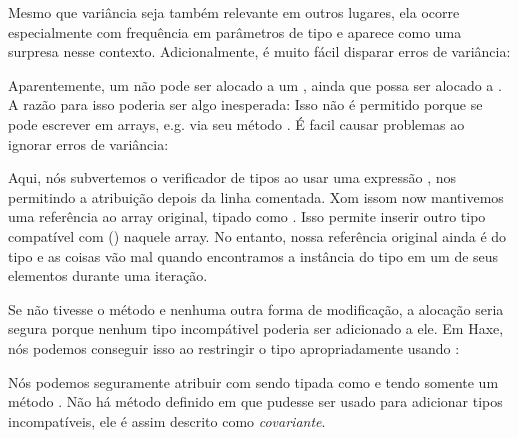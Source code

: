 Mesmo que variância seja também relevante em outros lugares, ela ocorre especialmente com frequência em parâmetros de tipo e aparece como uma surpresa nesse contexto. Adicionalmente, é muito fácil disparar erros de variância:


Aparentemente, um  não pode ser alocado a um , ainda que  possa ser alocado a . A razão para isso poderia ser algo inesperada: Isso não é permitido porque se pode escrever em arrays, e.g. via seu método . É facil causar problemas ao ignorar erros de variância:


Aqui, nós subvertemos o verificador de tipos ao usar uma expressão , nos  permitindo a atribuição depois da linha comentada. Xom issom now mantivemos uma referência  ao array original, tipado como . Isso permite inserir outro tipo compatível com  () naquele array. No entanto, nossa referência original   ainda é do tipo  e as coisas vão mal quando encontramos a instância do tipo  em um de seus elementos durante uma iteração.

Se  não tivesse o método  e nenhuma outra forma de modificação, a alocação seria segura porque nenhum tipo incompátivel poderia ser adicionado a ele. Em Haxe, nós podemos conseguir isso ao restringir o tipo apropriadamente usando :


Nós podemos seguramente atribuir com  sendo tipada como  e  tendo somente um método . Não há método definido em  que pudesse ser usado para adicionar tipos incompatíveis, ele é assim descrito como \emph{covariante}.








